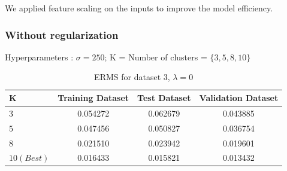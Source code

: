 \documentclass[11pt]{article}
\begin{document}
We applied feature scaling on the inputs to improve the model efficiency.\\

\subsubsection{Without regularization}
Hyperparameters : $\sigma = 250$; K = Number of clusters = $\{3,5,8,10\}$
\begin{table}[h]
\label{tab:tab3.2.1}
\begin{center}
\begin{tabular}{|l|c|c|c|}
\hline
\textbf{K} & \textbf{Training Dataset} & \textbf{Test Dataset} &\textbf{Validation Dataset}\\
\hline
 $3$ & 0.054272 & 0.062679 & 0.043885\\
\hline
 $5$ & 0.047456 & 0.050827 & 0.036754\\
\hline
 $8 $ & 0.021510 & 0.023942 & 0.019601\\
\hline
 $10 (Best) $ & 0.016433 & 0.015821 & 0.013432\\
\hline
\end{tabular}
\caption{ERMS for dataset 3, $\lambda = 0$}
\end{center}
\end{table}
\end{document}
